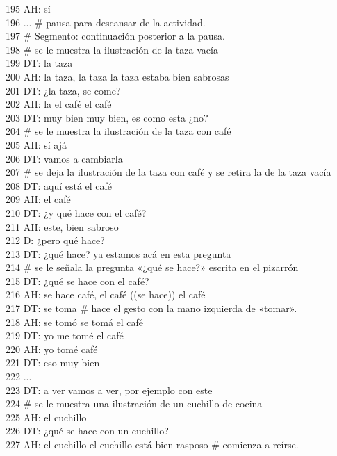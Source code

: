 195 AH: sí\\
196 ... # pausa para descansar de la actividad.\\
197 # Segmento: continuación posterior a la pausa.\\
198 # se le muestra la ilustración de la taza vacía\\
199 DT: la taza\\
200 AH: la taza, la taza la taza estaba bien sabrosas\\
201 DT: ¿la taza, se come?\\
202 AH: la el café el café\\
203 DT: muy bien muy bien, es como esta ¿no?\\
204 # se le muestra la ilustración de la taza con café\\
205 AH: sí ajá\\
206 DT: vamos a cambiarla\\
207 # se deja la ilustración de la taza con café y se retira la de la taza vacía\\
208 DT: aquí está el café\\
209 AH: el café\\
210 DT: ¿y qué hace con el café?\\
211 AH: este, bien sabroso\\
212 D: ¿pero qué hace?\\
213 DT: ¿qué hace? ya estamos acá en esta pregunta\\
214 # se le señala la pregunta «¿qué se hace?» escrita en el pizarrón\\
215 DT: ¿qué se hace con el café?\\
216 AH: se hace café, el café ((se hace)) el café\\
217 DT: se toma # hace el gesto con la mano izquierda de «tomar».\\
218 AH: se tomó se tomá el café\\
219 DT: yo me tomé el café\\
220 AH: yo tomé café\\
221 DT: eso muy bien\\
222 ...\\
223 DT: a ver vamos a ver, por ejemplo con este\\
224 # se le muestra una ilustración de un cuchillo de cocina\\
225 AH: el cuchillo\\
226 DT: ¿qué se hace con un cuchillo?\\
227 AH: el cuchillo el cuchillo está bien rasposo # comienza a reírse.\\
